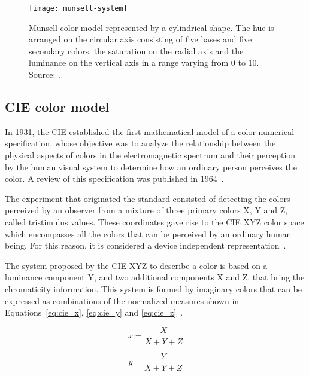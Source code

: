 \begin{figure}[!ht]
  \centering
  \texttt{[image: munsell-system]}
  \caption[Munsell color model.]{Munsell color model represented by a cylindrical shape. The hue is arranged on the circular axis consisting of five bases and five secondary colors, the saturation on the radial axis and the luminance on the vertical axis in a range varying from 0 to 10. Source: \citet{rus:07}.}
  \label{fig:munsell-system} 
\end{figure}

\subsection{CIE color model}
\label{sec:modelo_cores_cie}

In 1931, the CIE established the first mathematical model of a color numerical specification, whose objective was to analyze the relationship between the physical aspects of colors in the electromagnetic spectrum and their perception by the human visual system to determine how an ordinary person perceives the color. A review of this specification was published in 1964~\citep{gonzalez:02}.

The experiment that originated the standard consisted of detecting the colors perceived by an observer from a mixture of three primary colors X, Y and Z, called tristimulus values. These coordinates gave rise to the CIE XYZ color space which encompasses all the colors that can be perceived by an ordinary human being. For this reason, it is considered a device independent representation~\citep{konstantinos:00}.

The system proposed by the CIE XYZ to describe a color is based on a luminance component Y, and two additional components X and Z, that bring the chromaticity information. This system is formed by imaginary colors that can be expressed as combinations of the normalized measures shown in Equations~\ref{eq:cie_x}, \ref{eq:cie_y} and \ref{eq:cie_z}~\citep{konstantinos:00}.

\newpage
\begin{equation}
  x = \frac{X}{X + Y + Z}
\label{eq:cie_x}
\end{equation}

\begin{equation}
  y = \frac{Y}{X + Y + Z}
\label{eq:cie_y}
\end{equation}

